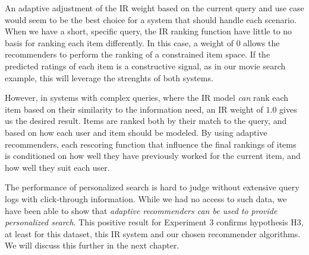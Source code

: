 An adaptive adjustment of the IR weight based on the current query and use case
would seem to be the best choice for a system that should handle each scenario.
When we have a short, specific query, the IR ranking function have little to
no basis for ranking each item differently.
In this case, a weight of $0$ allows the recommenders to perform the ranking
of a constrained item space.
If the predicted ratings of each item is a constructive signal,
as in our movie search example, this will leverage the strenghts of both systems.

However, in systems with complex queries, where the IR model
\emph{can} rank each item based on their similarity to the information need,
an IR weight of $1.0$ gives us the desired result.
Items are ranked both by their match to the query,
and based on how each user and item should be modeled.
By using adaptive recommenders, each rescoring function
that influence the final rankings of items is conditioned
on how well they have previously worked for the current item,
and how well they suit each user.

The performance of personalized search is hard to judge without
extensive query logs with click-through information.
While we had no access to such data, 
we have been able to show that \emph{adaptive recommenders
can be used to provide personalized search}.
This positive result for Experiment 3 confirms hypothesis H3,
at least for this dataset, this IR system and our chosen recommender algorithms.
We will discuss this further in the next chapter.
